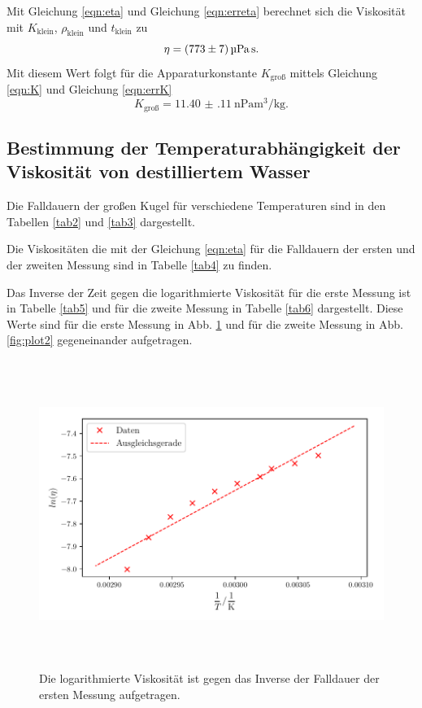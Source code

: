 Mit Gleichung \eqref{eqn:eta} und Gleichung \eqref{eqn:erreta} berechnet sich die Viskosität mit $K_\text{klein}$,
$\rho_\text{klein}$ und $t_\text{klein}$ zu
\begin{equation*}
    \eta = \SI{773 \pm 7}{\micro\pascal\second}.
\end{equation*}
Mit diesem Wert folgt für die Apparaturkonstante $K_\text{groß}$
mittels Gleichung \eqref{eqn:K} und Gleichung \eqref{eqn:errK}
\begin{equation*}
    K_\text{groß} = \SI{11.40(11)}{\nano\pascal\cubic\meter\per\kilo\gram}.
\end{equation*}

\subsection{Bestimmung der Temperaturabhängigkeit der Viskosität von destilliertem Wasser}
Die Falldauern der großen Kugel für verschiedene Temperaturen sind in den Tabellen
\ref{tab2} und \ref{tab3} dargestellt.


\noindent Die Viskositäten die mit der Gleichung \eqref{eqn:eta} für die Falldauern der ersten und der zweiten Messung
sind in Tabelle \ref{tab4} zu finden.

\noindent Das Inverse der Zeit gegen die logarithmierte Viskosität für die erste
Messung ist in Tabelle \ref{tab5} und für die zweite Messung in Tabelle
\ref{tab6} dargestellt.
Diese Werte sind für die erste Messung in Abb. \ref{fig:plot1} und für
die zweite Messung in Abb. \ref{fig:plot2} gegeneinander aufgetragen.


\begin{figure}
    \centering
    \includegraphics[width=14cm, height=10cm]{build/plot1.pdf}
    \caption{Die logarithmierte Viskosität ist gegen das Inverse
    der Falldauer der ersten Messung aufgetragen.}
    \label{fig:plot1}
\end{figure}
